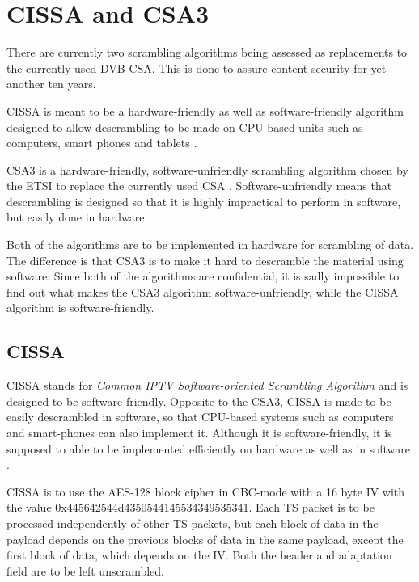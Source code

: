 \chapter{CISSA and CSA3}
There are currently two scrambling algorithms being assessed as replacements to 
the currently used DVB-CSA. This is done to assure content security for 
yet another ten years.


CISSA is meant to be a hardware-friendly as well as software-friendly algorithm 
designed to allow descrambling to be made on CPU-based units such as computers, 
smart phones and tablets \citep[p. 9]{DVB:2013}.

CSA3 is a hardware-friendly, software-unfriendly scrambling algorithm chosen by 
the ETSI to replace the currently used CSA \citep[pp. 6--7]{DVB:2013}. 
Software-unfriendly means that descrambling is designed so that it is highly 
impractical to perform in software, but easily done in hardware.

Both of the algorithms are to be implemented in hardware for scrambling of data.
The difference is that CSA3 is to make it hard to descramble the material using 
software. Since both of the algorithms are confidential, it is sadly impossible 
to find out what makes the CSA3 algorithm software-unfriendly, while the CISSA 
algorithm is software-friendly. 

\section{CISSA}
CISSA stands for \emph{Common IPTV Software-oriented Scrambling Algorithm} and 
is designed to be software-friendly. Opposite to the CSA3, CISSA is made to be 
easily descrambled in software, so that CPU-based systems such as computers and 
smart-phones can also implement it.  Although it is software-friendly, it is 
supposed to able to be implemented efficiently on hardware as well as in 
software \citep[p. 9]{DVB:2013}.

CISSA is to use the AES-128 block cipher in CBC-mode with a 16 byte IV with the 
value 0x445642544d4350544145534349535341. Each TS packet is to be processed 
independently of other TS packets, but each block of data in the payload depends 
on the previous blocks of data in the same payload, except the first block of 
data, which depends on the IV. Both the header and adaptation field are to be 
left unscrambled. \citep[p. 11]{DVB:2013}

